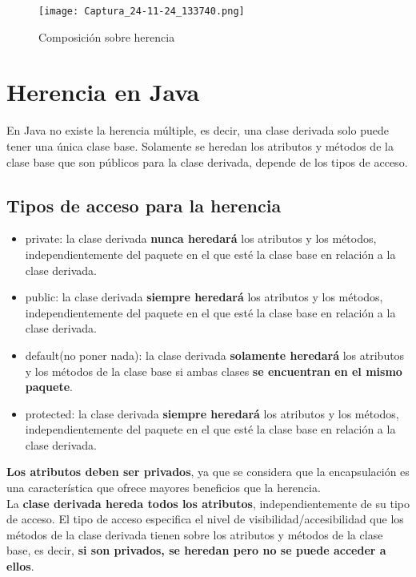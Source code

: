 \documentclass{article}
\begin{document}
\begin{figure}[h]
    \centering
    \texttt{[image: Captura\_24-11-24\_133740.png]}
    \caption{Composición sobre herencia}
\end{figure}

\newpage

\section{Herencia en Java}
En Java no existe la herencia múltiple, es decir, una clase derivada solo puede tener una única clase base. Solamente se heredan los atributos y métodos de la clase base que son públicos para la clase derivada, depende de los tipos de acceso. \\

\subsection{Tipos de acceso para la herencia}
\begin{itemize}
    \item private: la clase derivada \textbf{nunca heredará} los atributos y los métodos, independientemente del paquete en el que esté la clase base en relación a la clase derivada.
    \item public: la clase derivada \textbf{siempre heredará} los atributos y los métodos, independientemente del paquete en el que esté la clase base en relación a la clase derivada.
    \item default(no poner nada): la clase derivada \textbf{solamente heredará} los atributos y los métodos de la clase base si ambas clases \textbf{se encuentran en el mismo paquete}.
    \item protected: la clase derivada \textbf{siempre heredará} los atributos y los métodos, independientemente del paquete en el que esté la clase base en relación a la clase derivada.
\end{itemize}

\textbf{Los atributos deben ser privados}, ya que se considera que la encapsulación es una característica que ofrece mayores beneficios que la herencia. \\

La \textbf{clase derivada hereda todos los atributos}, independientemente de su tipo de acceso. El tipo de acceso especifica el nivel de visibilidad/accesibilidad que los métodos de la clase derivada tienen sobre los atributos y métodos de la clase base, es decir, \textbf{si son privados, se heredan pero no se puede acceder a ellos}. \\
\end{document}
